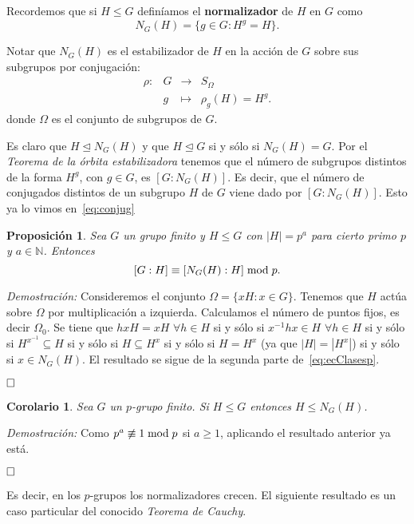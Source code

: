 \documentclass[12pt]{article}
\newtheorem{proposition}[theorem]{Proposición}
\newtheorem{corolario}{Corolario}[theorem]
\begin{document}
Recordemos que si $H \leq G$ definíamos el \textbf{normalizador} de $H$ en $G$ como $$N_G(H) = \lbrace g \in G : H^g = H \rbrace.$$

Notar que $N_G(H)$ es el estabilizador de $H$ en la acción de $G$ sobre sus subgrupos por conjugación:
 $$\begin{array}{rccl}
\rho\colon &G& \longrightarrow &S_{\Omega}\\
&g& \longmapsto &\rho_{g}(H) = H^{g}.
\end{array}
$$
donde $\Omega$ es el conjunto de subgrupos de $G$.

Es claro que $H \unlhd N_G(H)$ y que $H \unlhd G$ si y sólo si $N_G(H) =G$. Por el \textit{Teorema de la órbita estabilizadora} tenemos que el número de subgrupos distintos de la forma $H^g$, con $g \in G$, es $[G:N_G(H)]$. Es decir, que el número de conjugados distintos de un subgrupo $H$ de $G$ viene dado por $[G:N_G(H)]$. Esto ya lo vimos en~\ref{eq:conjug}

\begin{proposition}Sea $G$ un grupo finito y $H \leq G$ con $|H| = p^a$ para cierto primo $p$ y $a \in \mathbb{N}$. Entonces $$[G:H] \equiv [N_G(H):H] \hspace{0.1cm}\text{mod} \hspace{0.1cm} p.$$
\end{proposition}
\emph{Demostración: }Consideremos el conjunto $\Omega = \lbrace xH : x \in G \rbrace$. Tenemos que $H$ actúa sobre $\Omega$ por multiplicación a izquierda. Calculamos el número de puntos fijos, es decir $\Omega_0$. Se tiene que $hxH = xH$ $\forall h \in H$ si y sólo si $x^{-1}hx \in H$ $\forall h \in H$ si y sólo si $H^{x^{-1}} \subseteq H$ si y sólo si $H \subseteq H ^x$ si y sólo si $H = H^x$ (ya que $|H| = |H^x|$) si y sólo si $x\in N_G(H)$. El resultado se sigue de la segunda parte de~\ref{eq:ecClasesp}.

$\hfill \square$

\begin{corolario}\label{eq:cor411} Sea $G$ un $p$-grupo finito. Si $H \leq G$ entonces $H \leq N_G(H)$.
\end{corolario}
\emph{Demostración: }Como $p^a \not\equiv 1 \hspace{0.1cm}\text{mod} \hspace{0.1cm} p$ si $a \geq 1$, aplicando el resultado anterior ya está.

$\hfill \square$

Es decir, en los $p$-grupos los normalizadores crecen. El siguiente resultado es un caso particular del conocido \textit{Teorema de Cauchy}.
\end{document}
